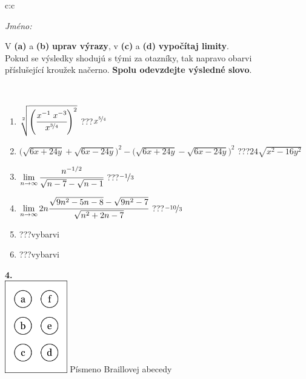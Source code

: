 \documentclass[10pt]{report}
\begin{document}
\begin{tabular}{c:c}
\begin{minipage}[c][104.5mm][t]{0.5\linewidth}
\begin{center}
\textit{Jméno:}\phantom{xxxxxxxxxxxxxxxxxxxxxxxxxxxxxxxxxxxxxxxxxxxxxxxxxxxxxxxxxxxxxxxxx}\\[5mm]
\begin{minipage}{0.95\linewidth}
\begin{center}
V \textbf{(a)} a \textbf{(b)} \textbf{uprav výrazy}, v \textbf{(c)} a \textbf{(d)} \textbf{vypočítaj limity}.\\Pokud se výsledky shodujú s tými za otazníky, tak napravo obarvi\\příslušející kroužek načerno. \textbf{Spolu odevzdejte výsledné slovo}.
\end{center}
\end{minipage}
\\[1mm]
\begin{minipage}{0.79\linewidth}
\begin{center}
\begin{varwidth}{\linewidth}
\begin{enumerate}
\small
\item $\sqrt[2]{\left(\cfrac{x^{-1}\;x^{-3}}{x^{\nicefrac{3}{4}}}\right)^{2}}$\quad \dotfill\; ???\;\dotfill \quad $x^{\nicefrac{5}{4}}$
\item {\footnotesize{\scriptsize$\big(\sqrt{6x+24y}+\sqrt{6x-24y}\big)^2-\big(\sqrt{6x+24y}-\sqrt{6x-24y}\big)^2$}\quad \dotfill\; ???\;\dotfill \quad $24\sqrt{x^2-16y^2}$}
\item $\lim\limits_{n\to\infty}\cfrac{n^{-1/2}}{\sqrt{n-7}-\sqrt{n-1}}$\quad \dotfill\; ???\;\dotfill \quad $\nicefrac{-1}{3}$
\item $\lim\limits_{n\to\infty}2n\cfrac{\sqrt{9n^2-5n-8}-\sqrt{9n^2-7}}{\sqrt{n^2+2n-7}}$\quad \dotfill\; ???\;\dotfill \quad $\nicefrac{-10}{3}$
\item \quad \dotfill\; ???\;\dotfill \quad vybarvi
\item \quad \dotfill\; ???\;\dotfill \quad vybarvi
\end{enumerate}
\end{varwidth}
\end{center}
\end{minipage}
\begin{minipage}{0.20\linewidth}
\begin{center}
{\Huge\bfseries 4.} \\[2mm]
\includegraphics[height=40mm]{../images/braille.png}
{\small Písmeno Braillovej abecedy}
\end{center}
\end{minipage}
\end{center}
\end{minipage}
%
\end{tabular}
\end{document}
